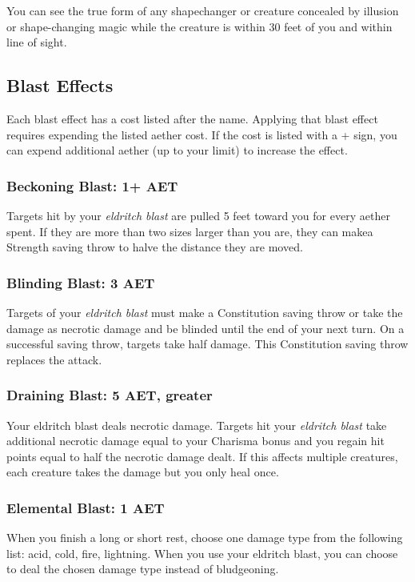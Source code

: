 You can see the true form of any shapechanger or creature concealed by illusion or shape-changing magic while the creature is within 30 feet of you and within line of sight.

\subsection{Blast Effects}

Each blast effect has a cost listed after the name. Applying that blast effect requires expending the listed aether cost. If the cost is listed with a + sign, you can expend additional aether (up to your limit) to increase the effect.

\subsubsection{Beckoning Blast: 1+ AET}
Targets hit by your \textit{eldritch blast} are pulled 5 feet toward you for every aether spent. If they are more than two sizes larger than you are, they can makea Strength saving throw to halve the distance they are moved.

\subsubsection{Blinding Blast: 3 AET}
Targets of your \textit{eldritch blast} must make a Constitution saving throw or take the damage as necrotic damage and be blinded until the end of your next turn. On a successful saving throw, targets take half damage. This Constitution saving throw replaces the attack.

\subsubsection{Draining Blast: 5 AET, greater}
Your eldritch blast deals necrotic damage. Targets hit your \textit{eldritch blast} take additional necrotic damage equal to your Charisma bonus and you regain hit points equal to half the necrotic damage dealt. If this affects multiple creatures, each creature takes the damage but you only heal once.

\subsubsection{Elemental Blast: 1 AET}
When you finish a long or short rest, choose one damage type from the following list: acid, cold, fire, lightning. When you use your eldritch blast, you can choose to deal the chosen damage type instead of bludgeoning.

